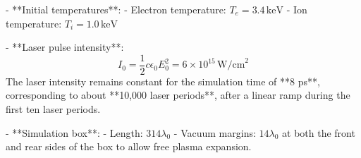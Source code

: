 - **Initial temperatures**:
  - Electron temperature: \( T_e = 3.4 \, \text{keV} \)
  - Ion temperature: \( T_i = 1.0 \, \text{keV} \)

- **Laser pulse intensity**:
  \[
  I_0 = \frac{1}{2} c \epsilon_0 E_0^2 = 6 \times 10^{15} \, \text{W/cm}^2
  \]
  The laser intensity remains constant for the simulation time of **8 ps**, corresponding to about **10,000 laser periods**, after a linear ramp during the first ten laser periods.

- **Simulation box**:
  - Length: \( 314 \lambda_0 \)
  - Vacuum margins: \( 14 \lambda_0 \) at both the front and rear sides of the box to allow free plasma expansion.
